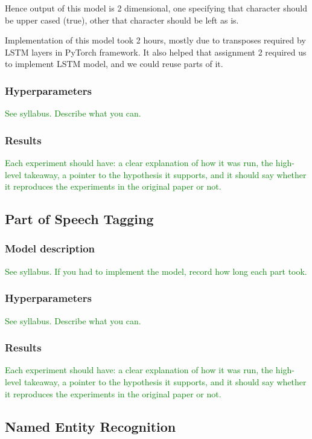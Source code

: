 \documentclass[11pt,a4paper]{article}
\begin{document}
    Hence output of this model is 2 dimensional, one specifying that character should be upper cased (true), other that character should be left as is.

    Implementation of this model took 2 hours, mostly due to transposes required by LSTM layers in PyTorch framework. It also helped that assignment 2 required us to implement LSTM model, and we could reuse parts of it.

    \subsubsection{Hyperparameters}
    \textcolor{green}{See syllabus. Describe what you can.}

    \subsubsection{Results}
    \textcolor{green}{Each experiment should have: a clear explanation of how it was run, the high-level takeaway, a pointer to the hypothesis it supports, and it should say whether it reproduces the experiments in the original paper or not.}

\subsection{Part of Speech Tagging}
\label{sec:exp-pos}

    \subsubsection{Model description}
    \textcolor{green}{See syllabus. If you had to implement the model, record how long each part took.}

    \subsubsection{Hyperparameters}
    \textcolor{green}{See syllabus. Describe what you can.}

    \subsubsection{Results}
    \textcolor{green}{Each experiment should have: a clear explanation of how it was run, the high-level takeaway, a pointer to the hypothesis it supports, and it should say whether it reproduces the experiments in the original paper or not.}

\subsection{Named Entity Recognition}
\label{sec:exp-ner}
\end{document}
